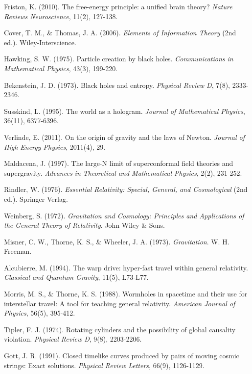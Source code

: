 \documentclass[12pt,a4paper]{article}
\begin{document}
\begin{thebibliography}{99}
Friston, K. (2010). The free-energy principle: a unified brain theory? \textit{Nature Reviews Neuroscience}, 11(2), 127-138.

Cover, T. M., \& Thomas, J. A. (2006). \textit{Elements of Information Theory} (2nd ed.). Wiley-Interscience.

Hawking, S. W. (1975). Particle creation by black holes. \textit{Communications in Mathematical Physics}, 43(3), 199-220.

Bekenstein, J. D. (1973). Black holes and entropy. \textit{Physical Review D}, 7(8), 2333-2346.

Susskind, L. (1995). The world as a hologram. \textit{Journal of Mathematical Physics}, 36(11), 6377-6396.

Verlinde, E. (2011). On the origin of gravity and the laws of Newton. \textit{Journal of High Energy Physics}, 2011(4), 29.

Maldacena, J. (1997). The large-N limit of superconformal field theories and supergravity. \textit{Advances in Theoretical and Mathematical Physics}, 2(2), 231-252.

Rindler, W. (1976). \textit{Essential Relativity: Special, General, and Cosmological} (2nd ed.). Springer-Verlag.

Weinberg, S. (1972). \textit{Gravitation and Cosmology: Principles and Applications of the General Theory of Relativity}. John Wiley \& Sons.

Misner, C. W., Thorne, K. S., \& Wheeler, J. A. (1973). \textit{Gravitation}. W. H. Freeman.

Alcubierre, M. (1994). The warp drive: hyper-fast travel within general relativity. \textit{Classical and Quantum Gravity}, 11(5), L73-L77.

Morris, M. S., \& Thorne, K. S. (1988). Wormholes in spacetime and their use for interstellar travel: A tool for teaching general relativity. \textit{American Journal of Physics}, 56(5), 395-412.

Tipler, F. J. (1974). Rotating cylinders and the possibility of global causality violation. \textit{Physical Review D}, 9(8), 2203-2206.

Gott, J. R. (1991). Closed timelike curves produced by pairs of moving cosmic strings: Exact solutions. \textit{Physical Review Letters}, 66(9), 1126-1129.


\end{thebibliography}
\end{document}
